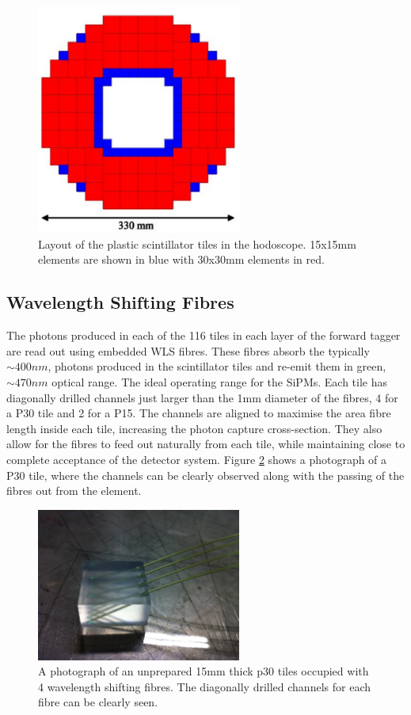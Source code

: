 \begin{figure}
	\centering
	\includegraphics[width=0.6\textwidth]{ImgChap1/hodo}
	\caption{Layout of the plastic scintillator tiles in the hodoscope. 15x15mm elements are shown in blue with 30x30mm elements in red. \cite{FTTDR2012}}
	\label{hodotilelayout}
\end{figure}


\subsection{Wavelength Shifting Fibres}

The photons produced in each of the 116 tiles in each layer of the forward tagger are read out using embedded WLS fibres. These fibres absorb the typically $\sim 400nm$, photons produced in the scintillator tiles and re-emit them in green, $\sim 470nm$ optical range. The ideal operating range for the SiPMs. Each tile has diagonally drilled channels just larger than the 1mm diameter of the fibres, 4 for a P30 tile and 2 for a P15. The channels are aligned to maximise the area fibre length inside each tile, increasing the photon capture cross-section. They also allow for the fibres to feed out naturally from each tile, while maintaining close to complete acceptance of the detector system.  Figure \ref{diagonalholes} shows a photograph of a P30 tile, where the channels can be clearly observed along with the passing of the fibres out from the element.

\begin{figure}
	\centering
	\includegraphics[width=0.6\textwidth]{ImgChap1/diagonalholes}
	\caption{A photograph of an unprepared 15mm thick p30 tiles occupied with 4 wavelength shifting fibres. The diagonally drilled channels for each fibre can be clearly seen.}
	\label{diagonalholes}
\end{figure}

